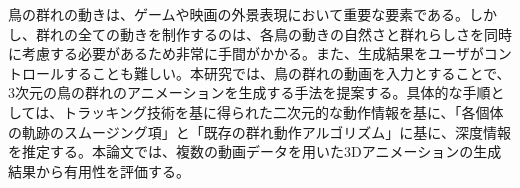 鳥の群れの動きは、ゲームや映画の外景表現において重要な要素である。しかし、群れの全ての動きを制作するのは、各鳥の動きの自然さと群れらしさを同時に考慮する必要があるため非常に手間がかかる。また、生成結果をユーザがコントロールすることも難しい。本研究では、鳥の群れの動画を入力とすることで、3次元の鳥の群れのアニメーションを生成する手法を提案する。具体的な手順としては、トラッキング技術を基に得られた二次元的な動作情報を基に、「各個体の軌跡のスムージング項」と「既存の群れ動作アルゴリズム」に基に、深度情報を推定する。本論文では、複数の動画データを用いた3Dアニメーションの生成結果から有用性を評価する。